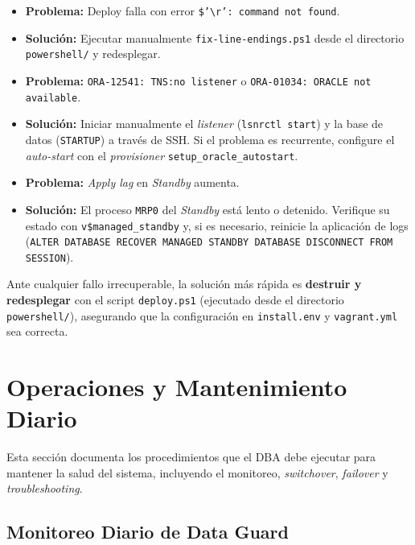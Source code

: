 \documentclass[11pt, a4paper]{report}
\begin{document}
\begin{itemize}
    \item \textbf{Problema:} Deploy falla con error \texttt{\$'\textbackslash r': command not found}.
\item \textbf{Solución:} Ejecutar manualmente \texttt{fix-line-endings.ps1} desde el directorio \texttt{powershell/} y redesplegar.
    \item \textbf{Problema:} \texttt{ORA-12541: TNS:no listener} o \texttt{ORA-01034: ORACLE not available}.
\item \textbf{Solución:} Iniciar manualmente el \textit{listener} (\texttt{lsnrctl start}) y la base de datos (\texttt{STARTUP}) a través de SSH. Si el problema es recurrente, configure el \textit{auto-start} con el \textit{provisioner} \texttt{setup\_oracle\_autostart}.
    \item \textbf{Problema:} \textit{Apply lag} en \textit{Standby} aumenta.
\item \textbf{Solución:} El proceso \texttt{MRP0} del \textit{Standby} está lento o detenido. Verifique su estado con \texttt{v\$managed\_standby} y, si es necesario, reinicie la aplicación de logs (\texttt{ALTER DATABASE RECOVER MANAGED STANDBY DATABASE DISCONNECT FROM SESSION}).
\end{itemize}

Ante cualquier fallo irrecuperable, la solución más rápida es \textbf{destruir y redesplegar} con el script \texttt{deploy.ps1} (ejecutado desde el directorio \texttt{powershell/}), asegurando que la configuración en \texttt{install.env} y \texttt{vagrant.yml} sea correcta.

\newpage


\chapter{Operaciones y Mantenimiento Diario}

Esta sección documenta los procedimientos que el DBA debe ejecutar para mantener la salud del sistema, incluyendo el monitoreo, \textit{switchover}, \textit{failover} y \textit{troubleshooting}.
\section{Monitoreo Diario de Data Guard}
\end{document}
